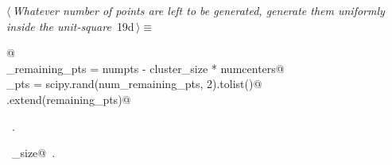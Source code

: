 \documentclass[11.5pt]{report}
\begin{document}
\vspace{-0.8cm} \newchunk
\begin{flushleft} \small
\begin{minipage}{\linewidth}\label{scrap20}\raggedright\small
{} $\langle\,${\itshape Whatever number of points are left to be generated, generate them uniformly inside the unit-square}\nobreak\ {\footnotesize {19d}}$\,\rangle\equiv$
\vspace{-1ex}
\begin{list}{}{} \item
\mbox{}\verb@   @\\
\mbox{}\verb@num_remaining_pts = numpts - cluster_size * numcenters@\\
\mbox{}\verb@remaining_pts = scipy.rand(num_remaining_pts, 2).tolist()@\\
\mbox{}\verb@points.extend(remaining_pts)@\\
\mbox{}\verb@@{\NWsep}
\end{list}
\vspace{-1.5ex}
\footnotesize
\begin{list}{}{\setlength{\itemsep}{-\parsep}\setlength{\itemindent}{-\leftmargin}}
\item \NWtxtMacroRefIn\ .
\item \NWtxtIdentsUsed\nobreak\  \verb@cluster_size@\nobreak\ .
\item{}
\end{list}
\end{minipage}\vspace{4ex}
\end{flushleft}
\end{document}
